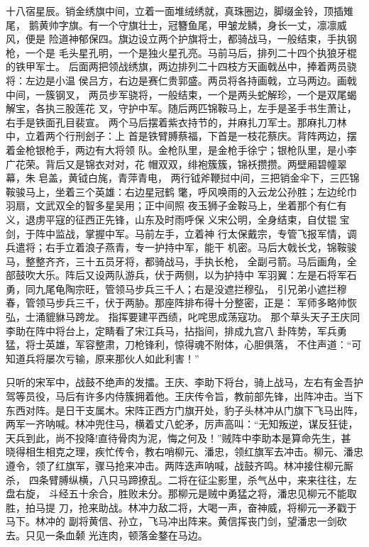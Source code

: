 十八宿星辰。销金绣旗中间，立着一面堆绒绣就，真珠圈边，脚缀金铃，顶插雉尾，
鹅黄帅字旗。有一个守旗壮士，冠簪鱼尾，甲皱龙鳞，身长一丈，凛凛威风，便是
险道神郁保四。旗边设立两个护旗将士，都骑战马，一般结束，手执钢枪，一个是
毛头星孔明，一个是独火星孔亮。马前马后，排列二十四个执狼牙棍的铁甲军士。
后面两把领战绣旗，两边排列二十四枝方天画戟丛中，捧着两员骁将：左边是小温
侯吕方，右边是赛仁贵郭盛。两员将各持画戟，立马两边。画戟中间，一簇钢叉，
两员步军骁将，一般结束，一个是两头蛇解珍，一个是双尾蝎解宝，各执三股莲花
叉，守护中军。随后两匹锦鞍马上，左手是圣手书生萧让，右手是铁面孔目裴宣。
两个马后摆着紫衣持节的，并麻扎刀军士。那麻扎刀林中，立着两个行刑刽子：上
首是铁臂膊蔡福，下首是一枝花蔡庆。背阵两边，摆着金枪银枪手，两边有大将领
队。金枪队里，是金枪手徐宁；银枪队里，是小李广花荣。背后又是锦衣对对，花
帽双双，绯袍簇簇，锦袄攒攒。两壁厢碧幢翠幕，朱皂盖，黄钺白旄，青萍青电，
两行钺斧鞭挝中间，三把销金伞下，三匹锦鞍骏马上，坐着三个英雄：右边星冠鹤
氅，呼风唤雨的入云龙公孙胜；左边纶巾羽扇，文武双全的智多星吴用；正中间照
夜玉狮子金鞍马上，坐着那个有仁有义，退虏平寇的征西正先锋，山东及时雨呼保
义宋公明，全身结束，自仗锟宝剑，于阵中监战，掌握中军。马前左手，立着神
行太保戴宗，专管飞报军情，调兵遣将；右手立着浪子燕青，专一护持中军，能干
机密。马后大戟长戈，锦鞍骏马，整整齐齐，三十五员牙将，都骑战马，手执长枪，
全副弓箭。马后画角，全部鼓吹大乐。阵后又设两队游兵，伏于两侧，以为护持中
军羽翼：左是石将军石勇，同九尾龟陶宗旺，管领马步兵三千人；右是没遮拦穆弘，
引兄弟小遮拦穆春，管领马步兵三千，伏于两胁。那座阵排布得十分整密，正是：
军师多略帅恢弘，士涌貔貅马跨龙。
指挥要建平西绩，叱咤思成荡寇功。
那个草头天子王庆同李助在阵中将台上，定睛看了宋江兵马，拈指间，排成九宫八
卦阵势，军兵勇猛，将士英雄，军容整肃，刀枪锋利，惊得魂不附体，心胆俱落，
不住声道：“可知道兵将屡次亏输，原来那伙人如此利害！”

只听的宋军中，战鼓不绝声的发擂。王庆、李助下将台，骑上战马，左右有金吾护
驾等员役，马后有许多内侍簇拥着他。王庆传令旨，教前部先锋，出阵冲击。当下
东西对阵。是日干支属木。宋阵正西方门旗开处，豹子头林冲从门旗下飞马出阵，
两军一齐呐喊。林冲兜住马，横着丈八蛇矛，厉声高叫：“无知叛逆，谋反狂徒，
天兵到此，尚不投降!直待骨肉为泥，悔之何及！”贼阵中李助本是算命先生，甚
晓得相生相克之理，疾忙传令，教右哨柳元、潘忠，领红旗军去冲击。柳元、潘忠
遵令，领了红旗军，骤马抢来冲击。两阵迭声呐喊，战鼓齐鸣。林冲接住柳元厮杀，
四条臂膊纵横，八只马蹄撩乱。二将在征尘影里，杀气丛中，来来往往，左盘右旋，
斗经五十余合，胜败未分。那柳元是贼中勇猛之将，潘忠见柳元不能取胜，拍马提
刀，抢来助战。林冲力敌二将，大喝一声，奋神威，将柳元一矛戳于马下。林冲的
副将黄信、孙立，飞马冲出阵来。黄信挥丧门剑，望潘忠一剑砍去。只见一条血颡
光连肉，顿落金鍪在马边。

